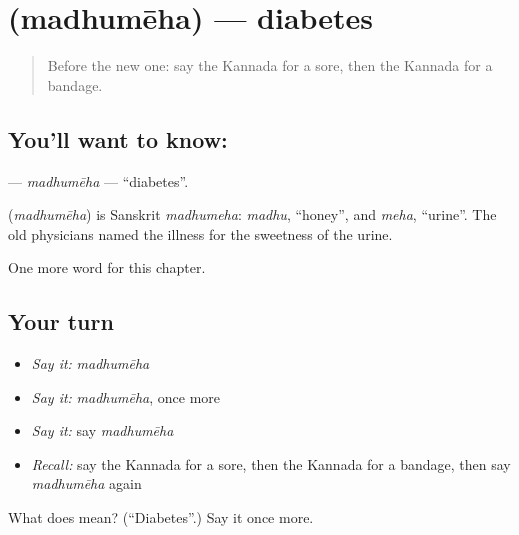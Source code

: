 \section[\texorpdfstring{\kn{ಮಧುಮೇಹ} (madhumēha)}{ಮಧುಮೇಹ (madhumēha)}]{ (madhumēha) — diabetes}

\label{lesson:KA-C246-madhumeha}



\begin{quote}
Before the new one: say the Kannada for a sore, then the Kannada for a bandage.
\end{quote}

\subsection*{You'll want to know: }
\textbf{} — \emph{madhumēha} — \textquotedblleft{}diabetes\textquotedblright{}.

\begin{cousinweb}
\textbf{} (\emph{madhumēha}) is Sanskrit \emph{madhumeha}: \emph{madhu}, \textquotedblleft{}honey\textquotedblright{}, and \emph{meha}, \textquotedblleft{}urine\textquotedblright{}. The old physicians named the illness for the sweetness of the urine.
\end{cousinweb}

\begin{grammarlens}[title={What you've built}]
One more word for this chapter.
\end{grammarlens}

\subsection*{Your turn}
\begin{itemize}
\raggedright
  \item \emph{Say it:} \emph{madhumēha}
  \item \emph{Say it:} \emph{madhumēha}, once more
  \item \emph{Say it:} say \emph{madhumēha}
  \item \emph{Recall:} say the Kannada for a sore, then the Kannada for a bandage, then say \emph{madhumēha} again
\end{itemize}

\begin{tcolorbox}[breakable,colback=teal!4,colframe=teal!35!black,title={Before you move on}]
What does  mean? (\textquotedblleft{}Diabetes\textquotedblright{}.) Say it once more.
\end{tcolorbox}
